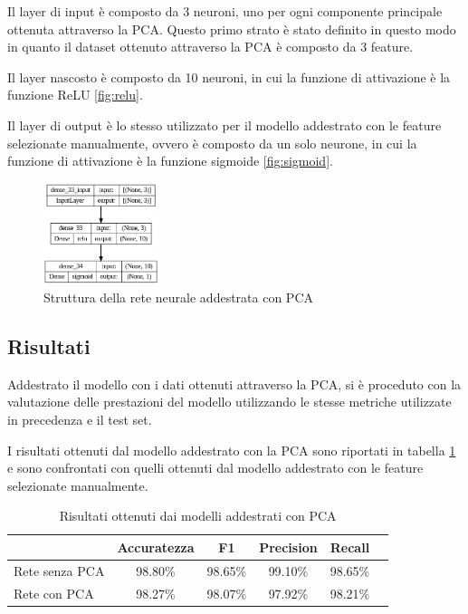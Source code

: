 Il layer di input è composto da 3 neuroni, uno per ogni componente principale
ottenuta attraverso la PCA. Questo primo strato è stato definito in questo modo
in quanto il dataset ottenuto attraverso la PCA è composto da 3 feature.

Il layer nascosto è composto da 10 neuroni, in cui la funzione di attivazione è
la funzione ReLU \ref{fig:relu}.

Il layer di output è lo stesso utilizzato per il modello addestrato con le feature
selezionate manualmente, ovvero è composto da un solo neurone, in cui la funzione
di attivazione è la funzione sigmoide \ref{fig:sigmoid}.
\begin{figure}[!ht]
    \centering
    \includegraphics[width=0.3\textwidth]{img/rete/struttura_rete_pca.png}
    \caption{Struttura della rete neurale addestrata con PCA}
    \label{fig:strutturaReteNeuralePCA}
\end{figure}
\subsection{Risultati}
Addestrato il modello con i dati ottenuti attraverso la PCA, si è proceduto con
la valutazione delle prestazioni del modello utilizzando le stesse metriche
utilizzate in precedenza e il test set.

I risultati ottenuti dal modello addestrato con la PCA sono riportati in tabella
\ref{tab:risultatiReteNeuralePCA} e sono confrontati con quelli ottenuti dal
modello addestrato con le feature selezionate manualmente.

\begin{table}[ht]
    \centering
    \begin{tabular}{@{}lccccc@{}}
        \toprule
        \rowcolor[HTML]{EFEFEF}
        \multicolumn{1}{c}{\cellcolor[HTML]{EFEFEF}\textbf{Modello}} & \textbf{Accuratezza} & \textbf{F1} & \textbf{Precision} & \textbf{Recall} \\ \midrule
        Rete senza PCA                                               & 98.80\%              & 98.65\%     & 99.10\%            & 98.65\%         \\
        Rete con PCA                                                 & 98.27\%              & 98.07\%     & 97.92\%            & 98.21\%         \\ \bottomrule
    \end{tabular}
    \caption{Risultati ottenuti dai modelli addestrati con PCA}
    \label{tab:risultatiReteNeuralePCA}
\end{table}

